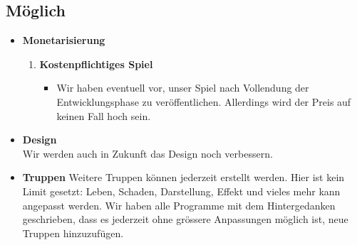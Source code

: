 \subsection{Möglich}
\begin{itemize}
    \item \textbf{Monetarisierung} \\
    \begin{enumerate}
        \item \textbf{Kostenpflichtiges Spiel}
        \begin{itemize}
            \item Wir haben eventuell vor, unser Spiel nach Vollendung der Entwicklungsphase zu veröffentlichen. Allerdings wird der Preis auf keinen Fall hoch sein.
        \end{itemize}
    \end{enumerate}
    \item \textbf{Design} \\
        Wir werden auch in Zukunft das Design noch verbessern. 
    \item \textbf{Truppen}
        Weitere Truppen können jederzeit erstellt werden. Hier ist kein Limit gesetzt: Leben, Schaden, Darstellung, Effekt und vieles mehr kann angepasst werden. 
        Wir haben alle Programme mit dem Hintergedanken geschrieben, dass es jederzeit ohne grössere Anpassungen möglich ist, neue Truppen hinzuzufügen.
    
\end{itemize}

